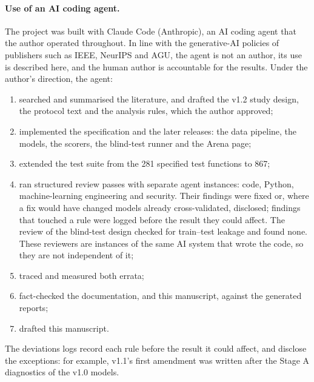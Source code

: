 \documentclass[10pt,twocolumn,a4paper]{article}
\begin{document}
\paragraph{Use of an AI coding agent.} The project was built with Claude Code (Anthropic), an AI coding agent that the
author operated throughout. In line with the generative-AI policies of publishers such as IEEE, NeurIPS and AGU, the
agent is not an author, its use is described here, and the human author is accountable for the results. Under the
author's direction, the agent:
\begin{enumerate}[label=(\roman*)]
  \item searched and summarised the literature, and drafted the v1.2 study design, the protocol text and the analysis
    rules, which the author approved;
  \item implemented the specification and the later releases: the data pipeline, the models, the scorers, the
    blind-test runner and the Arena page;
  \item extended the test suite from the 281 specified test functions to 867;
  \item ran structured review passes with separate agent instances: code, Python, machine-learning engineering and
    security. Their findings were fixed or, where a fix would have changed models already cross-validated,
    disclosed; findings that touched a rule were logged before the result they could affect. The review of the
    blind-test design checked for train--test leakage and found none. These reviewers are instances of the same AI
    system that wrote the code, so they are not independent of it;
  \item traced and measured both errata;
  \item fact-checked the documentation, and this manuscript, against the generated reports;
  \item drafted this manuscript.
\end{enumerate}
The deviations logs record each rule before the result it could affect, and disclose the exceptions: for example,
v1.1's first amendment was written after the Stage A diagnostics of the v1.0 models.
\end{document}
